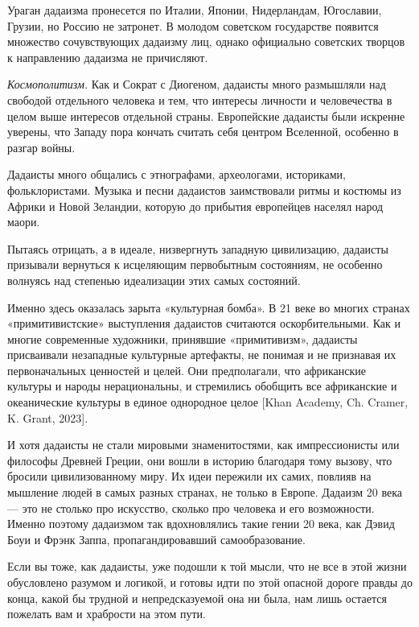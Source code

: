 Ураган дадаизма пронесется по Италии, Японии, Нидерландам, Югославии, Грузии, но Россию не затронет. В молодом советском государстве появится множество сочувствующих дадаизму лиц, однако официально советских творцов к направлению дадаизма не причисляют.

\textit{Космополитизм.}
Как и Сократ с Диогеном, дадаисты много размышляли над свободой отдельного человека и тем, что интересы личности и человечества в целом выше интересов отдельной страны. Европейские дадаисты были искренне уверены, что Западу пора кончать считать себя центром Вселенной, особенно в разгар  войны.

Дадаисты много общались с этнографами, археологами, историками, фольклористами. Музыка и песни дадаистов заимствовали ритмы и костюмы из Африки и Новой Зеландии, которую до прибытия европейцев населял народ маори.

Пытаясь отрицать, а в идеале, низвергнуть западную цивилизацию, дадаисты призывали вернуться к исцеляющим первобытным состояниям, не особенно волнуясь над степенью идеализации этих самых состояний.

Именно здесь оказалась зарыта «культурная бомба». В 21 веке во многих странах «примитивистские» выступления дадаистов считаются оскорбительными. Как и многие современные художники, принявшие «примитивизм», дадаисты присваивали незападные культурные артефакты, не понимая и не признавая их первоначальных ценностей и целей. Они предполагали, что африканские культуры и народы нерациональны, и стремились обобщить все африканские и океанические культуры в единое однородное целое [Khan Academy, Ch. Cramer, K. Grant, 2023].

И хотя дадаисты не стали мировыми знаменитостями, как импрессионисты или философы Древней Греции, они вошли в историю благодаря тому  вызову, что бросили цивилизованному миру. Их идеи пережили их самих, повлияв на мышление людей в самых разных странах, не только в Европе. Дадаизм 20 века --- это не столько про искусство, сколько про человека и его возможности. Именно поэтому дадаизмом так вдохновлялись такие гении 20 века, как Дэвид Боуи и Фрэнк Заппа, пропагандировавший самообразование.

Если вы тоже, как дадаисты, уже подошли к той мысли, что не все в этой жизни обусловлено разумом и логикой, и готовы идти по этой опасной дороге правды до конца, какой бы трудной и непредсказуемой она ни была, нам лишь остается пожелать вам  и храбрости на этом пути.


